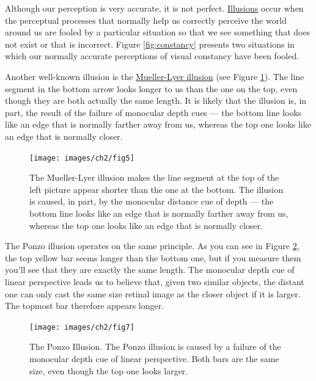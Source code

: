 \documentclass[
]{krantz}
\begin{document}
Although our perception is very accurate, it is not perfect. \hyperref[illusions]{Illusions} occur when the perceptual processes that normally help us correctly perceive the world around us are fooled by a particular situation so that we see something that does not exist or that is incorrect. Figure \ref{fig:constancy} presents two situations in which our normally accurate perceptions of visual constancy have been fooled.

Another well-known illusion is the \hyperref[mueller-lyer-illusion]{Mueller-Lyer illusion} (see Figure \ref{fig:muellerlyer}). The line segment in the bottom arrow looks longer to us than the one on the top, even though they are both actually the same length. It is likely that the illusion is, in part, the result of the failure of monocular depth cues --- the bottom line looks like an edge that is normally farther away from us, whereas the top one looks like an edge that is normally closer.

\begin{figure}

{\centering \texttt{[image: images/ch2/fig5]} 

}

\caption{The Mueller-Lyer illusion makes the line segment at the top of the left picture appear shorter than the one at the bottom. The illusion is caused, in part, by the monocular distance cue of depth — the bottom line looks like an edge that is normally farther away from us, whereas the top one looks like an edge that is normally closer.}\label{fig:muellerlyer}
\end{figure}

The Ponzo illusion operates on the same principle. As you can see in Figure \ref{fig:ponzoillusion}, the top yellow bar seems longer than the bottom one, but if you measure them you'll see that they are exactly the same length. The monocular depth cue of linear perspective leads us to believe that, given two similar objects, the distant one can only cast the same size retinal image as the closer object if it is larger. The topmost bar therefore appears longer.

\begin{figure}

{\centering \texttt{[image: images/ch2/fig7]} 

}

\caption{The Ponzo Illusion. The Ponzo illusion is caused by a failure of the monocular depth cue of linear perspective. Both bars are the same size, even though the top one looks larger.}\label{fig:ponzoillusion}
\end{figure}
\end{document}
